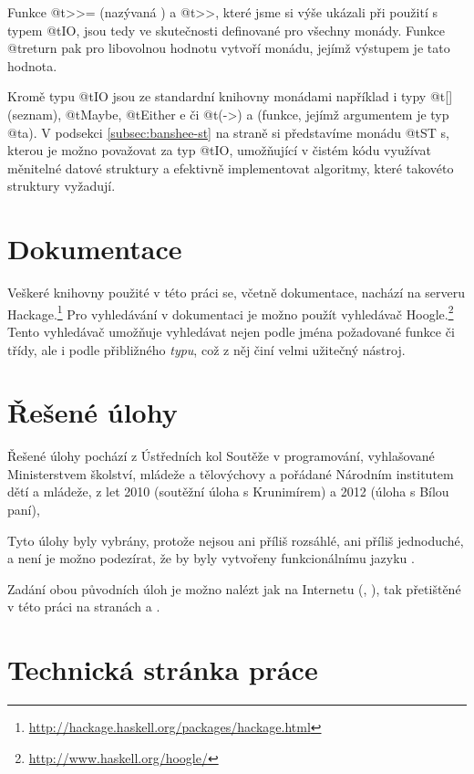 Funkce @t{>>=} (nazývaná ) a @t{>>}, které jsme si výše ukázali při
použití s typem @t{IO}, jsou tedy ve skutečnosti definované pro všechny monády.
Funkce @t{return} pak pro libovolnou hodnotu vytvoří monádu, jejímž výstupem je
tato hodnota.

Kromě typu @t{IO} jsou ze standardní knihovny monádami například i typy @t{[]}
(seznam), @t{Maybe}, @t{Either e} či @t{(->) a} (funkce, jejímž argumentem je
typ @t{a}).  V podsekci \ref{subsec:banshee-st} na straně
\pageref{subsec:banshee-st} si představíme monádu @t{ST s}, kterou je možno
považovat za  typ @t{IO}, umožňující v čistém kódu využívat
měnitelné datové struktury a efektivně implementovat algoritmy, které takovéto
struktury vyžadují.

\section{Dokumentace}

Veškeré knihovny použité v této práci se, včetně dokumentace, nachází na serveru
Hackage.\footnote{\url{http://hackage.haskell.org/packages/hackage.html}} Pro
vyhledávání v dokumentaci je možno použít vyhledávač
Hoogle.\footnote{\url{http://www.haskell.org/hoogle/}} Tento vyhledávač umožňuje
vyhledávat nejen podle jména požadované funkce či třídy, ale i podle přibližného
\emph{typu}, což z něj činí velmi užitečný nástroj.

\section{Řešené úlohy}

Řešené úlohy pochází z Ústředních kol Soutěže v programování, vyhlašované
Ministerstvem školství, mládeže a tělovýchovy a pořádané Národním institutem
dětí a mládeže, z let 2010 (soutěžní úloha s Krunimírem) a 2012 (úloha s Bílou
paní),

Tyto úlohy byly vybrány, protože nejsou ani příliš rozsáhlé, ani příliš
jednoduché, a není je možno podezírat, že by byly vytvořeny funkcionálnímu jazyku
.

Zadání obou původních úloh je možno nalézt jak na Internetu
(\cite{krunimir-task}, \cite{banshee-task}), tak přetištěné v této práci na
stranách \pageref{pdf:krunimir} a \pageref{pdf:banshee}.

\section{Technická stránka práce}

